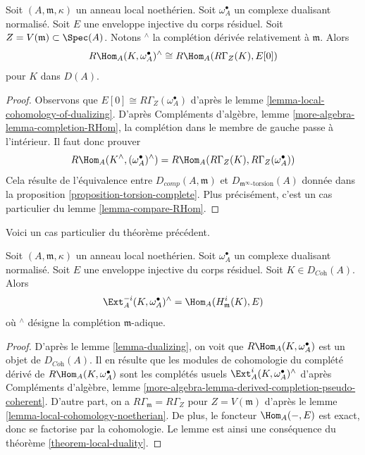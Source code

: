 \begin{theorem}
\label{theorem-local-duality}
Soit $(A, \mathfrak m, \kappa)$ un anneau local noethérien.
Soit $\omega_A^\bullet$ un complexe dualisant normalisé.
Soit $E$ une enveloppe injective du corps résiduel.
Soit $Z = V(\mathfrak m) \subset \Spec(A)$.
Notons ${}^\wedge$ la complétion dérivée relativement à $\mathfrak m$.
Alors
$$
R\Hom_A(K, \omega_A^\bullet)^\wedge \cong R\Hom_A(R\Gamma_Z(K), E[0])
$$
pour $K$ dans $D(A)$.
\end{theorem}

\begin{proof}
Observons que $E[0] \cong R\Gamma_Z(\omega_A^\bullet)$ d'après le lemme \ref{lemma-local-cohomology-of-dualizing}.
D'après Compléments d'algèbre, lemme \ref{more-algebra-lemma-completion-RHom},
la complétion dans le membre de gauche passe à l'intérieur.
Il faut donc prouver
$$
R\Hom_A(K^\wedge, (\omega_A^\bullet)^\wedge)
=
R\Hom_A(R\Gamma_Z(K), R\Gamma_Z(\omega_A^\bullet))
$$
Cela résulte de l'équivalence entre $D_{comp}(A, \mathfrak m)$ et $D_{\mathfrak m^\infty\text{-torsion}}(A)$
donnée dans la proposition \ref{proposition-torsion-complete}.
Plus précisément, c'est un cas particulier du lemme \ref{lemma-compare-RHom}.
\end{proof}

\noindent
Voici un cas particulier du théorème précédent.

\begin{lemma}
\label{lemma-special-case-local-duality}
Soit $(A, \mathfrak m, \kappa)$ un anneau local noethérien.
Soit $\omega_A^\bullet$ un complexe dualisant normalisé.
Soit $E$ une enveloppe injective du corps résiduel.
Soit $K \in D_{\textit{Coh}}(A)$. Alors
$$
\Ext^{-i}_A(K, \omega_A^\bullet)^\wedge =
\Hom_A(H^i_{\mathfrak m}(K), E)
$$
où ${}^\wedge$ désigne la complétion $\mathfrak m$-adique.
\end{lemma}

\begin{proof}
D'après le lemme \ref{lemma-dualizing}, on voit que $R\Hom_A(K, \omega_A^\bullet)$ est un objet de $D_{\textit{Coh}}(A)$.
Il en résulte que les modules de cohomologie du complété dérivé de $R\Hom_A(K, \omega_A^\bullet)$
sont les complétés usuels $\Ext^i_A(K, \omega_A^\bullet)^\wedge$ d'après
Compléments d'algèbre, lemme \ref{more-algebra-lemma-derived-completion-pseudo-coherent}.
D'autre part, on a $R\Gamma_{\mathfrak m} = R\Gamma_Z$ pour $Z = V(\mathfrak m)$ d'après le lemme \ref{lemma-local-cohomology-noetherian}.
De plus, le foncteur $\Hom_A(-, E)$ est exact, donc se factorise par la cohomologie.
Le lemme est ainsi une conséquence du théorème \ref{theorem-local-duality}.
\end{proof}





